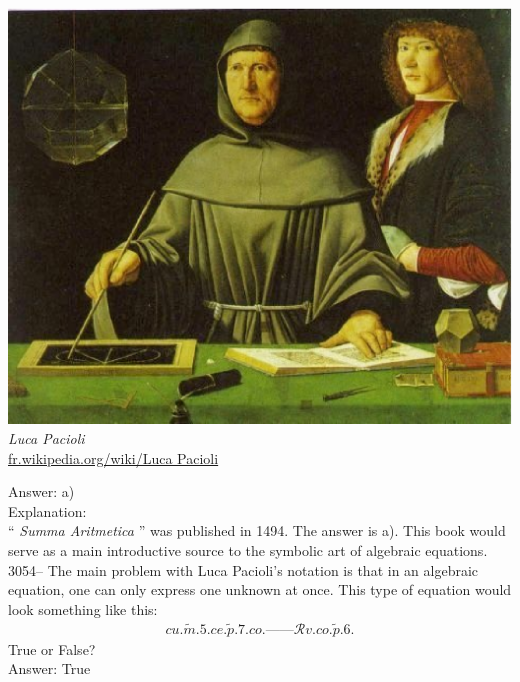 \documentclass[letterpaper, 12pt]{article}
\begin{document}
\begin{center}
\includegraphics[scale=0.25]{Pacioli.eps}\\
\emph{{\small Luca Pacioli}}\\
\href{http://fr.wikipedia.org/wiki/Luca Pacioli}{fr.wikipedia.org/wiki/Luca Pacioli}\\
\end{center}

Answer: a)\\

Explanation:\\
`` \emph{Summa Aritmetica} '' was published in 1494. The answer is a). This book would serve as a main introductive source to the symbolic art of algebraic equations.\\



3054-- The main problem with Luca Pacioli's notation is that in an algebraic equation, one can only express one unknown at once. This type of equation would look something like this:\\
\begin{eqnarray*}
cu.\tilde{m}.5.ce.\tilde{p}.7.co.\textrm{------}\mathcal{R}v.co.\tilde{p}.6.
\end{eqnarray*}
True or False?\\

Answer: True\\
\end{document}
